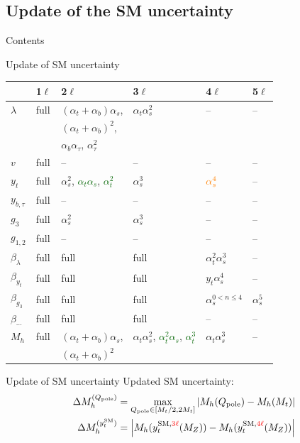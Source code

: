 \documentclass[hyperref={pdfpagelabels=false},ngerman]{beamer}
\newcommand{\SM}{\ensuremath{\text{SM}}}
\newcommand{\at}{\alpha_t}
\newcommand{\ab}{\alpha_b}
\newcommand{\atau}{\alpha_\tau}
\newcommand{\as}{\alpha_s}
\newcommand{\Loop}{\ensuremath{\ell}\xspace}
\newcommand{\Qpole}{\ensuremath{Q_\text{pole}}}
\newcommand{\DMhQpole}{\ensuremath{\Delta M_h^{(\Qpole)}}}
\newcommand{\DMhHSSUSYytSM}{\ensuremath{\Delta M_h^{(y_t^\SM)}}}
\begin{document}
\subsection{Update of the SM uncertainty}

\begin{frame}{Contents}
\end{frame}

\begin{frame}{Update of SM uncertainty}
  \centering
  \begin{tabular}{llllll}
    \toprule
               & 1\Loop & 2\Loop & 3\Loop & 4\Loop & 5\Loop\\
    \midrule
    $\lambda$  & full & $(\at+\ab)\as$, & $\at\as^2$ & -- & -- \\
               &      & $(\at+\ab)^2$, \\
               &      & $\ab\atau$, $\atau^2$ \\
    $v$        & full & -- & -- & -- & -- \\
    $y_t$      & full & $\as^2$, \textcolor{darkgreen}{$\at\as$}, \textcolor{darkgreen}{$\at^2$} & $\as^3$ & $\textcolor{orange}{\as^4}$ & -- \\
    $y_{b,\tau}$ & full & -- & -- & -- & -- \\
    $g_3$      & full & $\as^2$ &  $\as^3$ & -- & -- \\
    $g_{1,2}$   & full & -- & -- & -- & -- \\
    \midrule
    $\beta_{\lambda}$ & full & full & full & $\at^2\as^3$ & -- \\
    $\beta_{y_t}$    & full & full & full & $y_t\as^4$ & -- \\
    $\beta_{g_3}$    & full & full & full & $\as^{0<n\le 4}$ & $\as^5$ \\
    $\beta_{\cdots}$  & full & full & full & -- & -- \\
    \midrule
    $M_h$           & full & $(\at+\ab)\as$, & $\at\as^2$, \textcolor{darkgreen}{$\at^2\as$}, \textcolor{darkgreen}{$\at^3$} & $\at\as^3$ & -- \\
                    &      & $(\at + \ab)^2$ \\
    \bottomrule
  \end{tabular}
\end{frame}

\begin{frame}{Update of SM uncertainty}
  Updated SM uncertainty:
  \begin{align*}
    \DMhQpole &= \max_{\Qpole\in[M_t/2,2M_t]}\left|M_h(\Qpole) - M_h(M_t)\right| \\
    \DMhHSSUSYytSM &= \left| M_h(y_t^{\SM,\textcolor{red}{3\Loop}}(M_Z)) - M_h(y_t^{\SM,\textcolor{red}{4\Loop}}(M_Z)) \right|
  \end{align*}
\end{frame}
\end{document}
